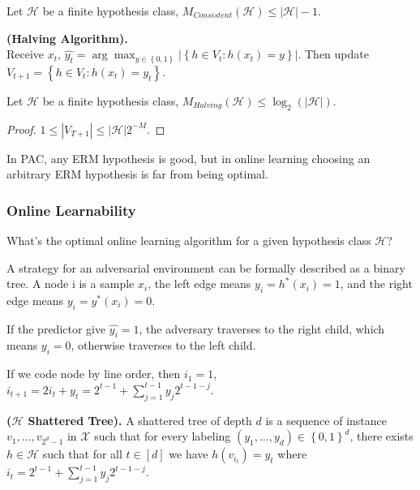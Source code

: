 \begin{corollary}
    Let $\mathcal{H}$ be a finite hypothesis class, $M_{Consistent}(\mathcal{H}) \le \left| \mathcal{H} \right| - 1$.
\end{corollary}

\begin{definition}
    \textbf{(Halving Algorithm).}\\
    Receive $ x_t $,
    $ \hat{y_t} = \arg\max_{y \in \left\{ 0, 1 \right\}} \left| \left\{ h \in V_t: h(x_t) = y \right\} \right| $.
    Then update $ V_{t+1} = \left\{ h \in V_t: h(x_t) = y_t\right\} $.
\end{definition}

\begin{corollary}
    Let $ \mathcal{H} $ be a finite hypothesis class, $ M_{Halving}(\mathcal{H}) \le \log_{2} (\left| \mathcal{H} \right|) $.
    \begin{proof}
        $ 1 \le \left| V_{T+1} \right| \le \left| \mathcal{H} \right| 2^{-M}$.
    \end{proof}
\end{corollary}

In PAC, any ERM hypothesis is good, but in online learning choosing an arbitrary ERM hypothesis is far from being optimal.

\subsubsection{Online Learnability}%

What's the optimal online learning algorithm for a given hypothesis class $ \mathcal{H} $?

A strategy for an adversarial environment can be formally described as a binary tree. A node i is a sample $ x_i $, the left edge means $ y_i = h^*(x_i) = 1 $, and the right edge means $ y_i = y^*(x_i) = 0 $. 

If the predictor give $ \hat{y_{i}} = 1 $, the adversary traverses to the right child, which means $ y_i = 0 $, otherwise traverses to the left child.

If we code node by line order, then $ i_1 = 1 $, $ i_{t+1} = 2i_{t} + y_t = 2^{t-1} + \sum^{t-1}_{j=1} y_j 2^{t - 1 - j} $.

\begin{definition}
    \textbf{($\mathcal{H}$ Shattered Tree).}
    A shattered tree of depth $ d $ is a sequence of instance $ v_1, \ldots, v_{2^d -1} $ in $ \mathcal{X} $ such that for every labeling $ (y_1, \ldots, y_d) \in {\left\{ 0, 1 \right\}}^d $, there exists $ h \in \mathcal{H} $ such that for all $ t \in [d] $ we have $ h(v_{i_t}) = y_t $ where $ i_t = 2^{t-1} + \sum^{t-1}_{j=1} y_j 2^{t - 1 - j} $.
\end{definition}

